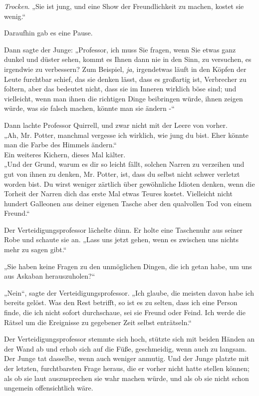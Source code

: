 {\emph{Trocken}. „Sie ist jung, und eine Show der Freundlichkeit zu machen, kostet sie wenig.“

Daraufhin gab es eine Pause.

Dann sagte der Junge: „Professor, ich muss Sie fragen, wenn Sie etwas ganz dunkel und düster sehen, kommt es Ihnen dann nie in den Sinn, zu versuchen, es irgendwie zu verbessern? Zum Beispiel, \emph{ja,} irgendetwas läuft in den Köpfen der Leute furchtbar schief, das sie denken lässt, dass es großartig ist, Verbrecher zu foltern, aber das bedeutet nicht, dass sie im Inneren wirklich böse sind; und vielleicht, wenn man ihnen die richtigen Dinge beibringen würde, ihnen zeigen würde, was sie falsch machen, könnte man sie ändern -“

Dann lachte Professor Quirrell, und zwar nicht mit der Leere von vorher.\\ „Ah, Mr. Potter, manchmal vergesse ich wirklich, wie jung du bist. Eher könnte man die Farbe des Himmels ändern.“\\ Ein weiteres Kichern, dieses Mal kälter.\\ „Und der Grund, warum es dir so leicht fällt, solchen Narren zu verzeihen und gut von ihnen zu denken, Mr. Potter, ist, dass du selbst nicht schwer verletzt worden bist. Du wirst weniger zärtlich über gewöhnliche Idioten denken, wenn die Torheit der Narren dich das erste Mal etwas Teures kostet. Vielleicht nicht hundert Galleonen aus deiner eigenen Tasche aber den qualvollen Tod von einem Freund.“

Der Verteidigungsprofessor lächelte dünn. Er holte eine Taschenuhr aus seiner Robe und schaute sie an. „Lass uns jetzt gehen, wenn es zwischen uns nichts mehr zu sagen gibt.“

„Sie haben keine Fragen zu den unmöglichen Dingen, die ich getan habe, um uns aus Askaban herauszuholen?“

„Nein“, sagte der Verteidigungsprofessor. „Ich glaube, die meisten davon habe ich bereits gelöst. Was den Rest betrifft, so ist es zu selten, dass ich eine Person finde, die ich nicht sofort durchschaue, sei sie Freund oder Feind. Ich werde die Rätsel um die Ereignisse zu gegebener Zeit selbst enträtseln.“

Der Verteidigungsprofessor stemmte sich hoch, stützte sich mit beiden Händen an der Wand ab und erhob sich auf die Füße, geschmeidig, wenn auch zu langsam. Der Junge tat dasselbe, wenn auch weniger anmutig. Und der Junge platzte mit der letzten, furchtbarsten Frage heraus, die er vorher nicht hatte stellen können; als ob sie laut auszusprechen sie wahr machen würde, und als ob sie nicht schon ungemein offensichtlich wäre.

}
